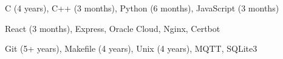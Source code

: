 
\begin{cvskills}
        {C (4 years), C++ (3 months), Python (6 months), JavaScript (3 months)} %

        {React (3 months), Express, Oracle Cloud, Nginx, Certbot} %
        
        {Git (5+ years), Makefile (4 years), Unix (4 years), MQTT, SQLite3}
\end{cvskills}
